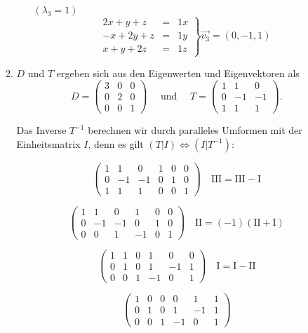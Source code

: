 \documentclass{homework}
\begin{document}
\begin{enumerate}
\begin{enumerate}
\begin{itemize}
\item[$(\lambda_3 = 1)$]
$$
\left.\begin{array}{rcl}
2x + y + z & = & 1x\\
-x + 2y + z & = & 1y\\
x + y + 2z & = & 1z
\end{array}\right\}
\vec{v_3} = (0, -1, 1)
$$
\end{itemize}

\item $D$ und $T$ ergeben sich aus den Eigenwerten und Eigenvektoren als
$$D = \begin{pmatrix}3 & 0 & 0\\ 0 & 2 & 0\\ 0 & 0 & 1\end{pmatrix}
\quad \text{ und } \quad
T = \begin{pmatrix}1 & 1 & 0\\ 0 & -1 & -1\\ 1 & 1 & 1\end{pmatrix}.$$

Das Inverse $T^{-1}$ berechnen wir durch paralleles Umformen mit der Einheitsmatrix $I$,
denn es gilt $(T | I) \Leftrightarrow (I | T^{-1})$:

$$\left(\begin{array}{ccc|ccc}
1 & 1 & 0 & 1 & 0 & 0\\
0 & -1 & -1 & 0 & 1 & 0\\
1 & 1 & 1 & 0 & 0 & 1
\end{array}\right) \quad \text{III} = \text{III} - \text{I}$$

$$\left(\begin{array}{ccc|ccc}
1 & 1 & 0 & 1 & 0 & 0\\
0 & -1 & -1 & 0 & 1 & 0\\
0 & 0 & 1 & -1 & 0 & 1
\end{array}\right) \quad \text{II} = (-1)(\text{II} + \text{I})$$

$$\left(\begin{array}{ccc|ccc}
1 & 1 & 0 & 1 & 0 & 0\\
0 & 1 & 0 & 1 & -1 & 1\\
0 & 0 & 1 & -1 & 0 & 1
\end{array}\right) \quad \text{I} = \text{I} - \text{II}$$

$$\left(\begin{array}{ccc|ccc}
1 & 0 & 0 & 0 & 1 & 1\\
0 & 1 & 0 & 1 & -1 & 1\\
0 & 0 & 1 & -1 & 0 & 1
\end{array}\right)$$


\end{enumerate}
\end{enumerate}
\end{document}
